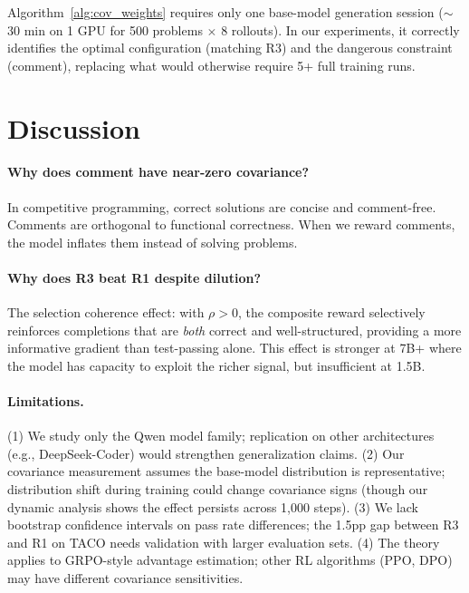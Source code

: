 \documentclass{article}
\begin{document}
Algorithm~\ref{alg:cov_weights} requires only one base-model generation session ($\sim$30 min on 1 GPU for 500 problems $\times$ 8 rollouts). In our experiments, it correctly identifies the optimal configuration (matching R3) and the dangerous constraint (comment), replacing what would otherwise require 5+ full training runs.

\section{Discussion}
\label{sec:discussion}

\paragraph{Why does comment have near-zero covariance?} In competitive programming, correct solutions are concise and comment-free. Comments are orthogonal to functional correctness. When we reward comments, the model inflates them instead of solving problems.

\paragraph{Why does R3 beat R1 despite dilution?} The selection coherence effect: with $\rho > 0$, the composite reward selectively reinforces completions that are \emph{both} correct and well-structured, providing a more informative gradient than test-passing alone. This effect is stronger at 7B+ where the model has capacity to exploit the richer signal, but insufficient at 1.5B.

\paragraph{Limitations.} (1) We study only the Qwen model family; replication on other architectures (e.g., DeepSeek-Coder) would strengthen generalization claims. (2) Our covariance measurement assumes the base-model distribution is representative; distribution shift during training could change covariance signs (though our dynamic analysis shows the effect persists across 1,000 steps). (3) We lack bootstrap confidence intervals on pass rate differences; the 1.5pp gap between R3 and R1 on TACO needs validation with larger evaluation sets. (4) The theory applies to GRPO-style advantage estimation; other RL algorithms (PPO, DPO) may have different covariance sensitivities.
\end{document}
